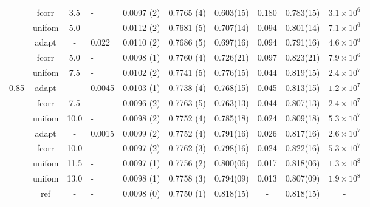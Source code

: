 \documentclass[aps,pre,preprint]{revtex4}
\begin{document}
\begin{table}
\begin{tabular*}{0.99\textwidth}{c|c|@{\extracolsep{\fill}}clcccccc}
    & \textrm{fcorr}  & 3.5     & -       & 0.0097 (2) & 0.7765 (4) & 0.603(15) & 0.180 & 0.783(15) & $3.1\times 10^6$\\\cline{2-10}
    & \textrm{unifom} & 5.0     & -       & 0.0112 (2) & 0.7681 (5) & 0.707(14) & 0.094 & 0.801(14) & $7.1\times 10^6$\\
    & \textrm{adapt}  & -       & 0.022   & 0.0110 (2) & 0.7686 (5) & 0.697(16) & 0.094 & 0.791(16) & $4.6\times 10^6$\\
    & \textrm{fcorr}  & 5.0     & -       & 0.0098 (1) & 0.7760 (4) & 0.726(21) & 0.097 & 0.823(21) & $7.9\times 10^6$\\\cline{2-10}
    & \textrm{unifom} & 7.5     & -       & 0.0102 (2) & 0.7741 (5) & 0.776(15) & 0.044 & 0.819(15) & $2.4\times 10^7$\\
0.85& \textrm{adapt}  & -       & 0.0045  & 0.0103 (1) & 0.7738 (4) & 0.768(15) & 0.045 & 0.813(15) & $1.2\times 10^7$\\
    & \textrm{fcorr}  & 7.5     & -       & 0.0096 (2) & 0.7763 (5) & 0.763(13) & 0.044 & 0.807(13) & $2.4\times 10^7$\\\cline{2-10}
    & \textrm{unifom} & 10.0    & -       & 0.0098 (2) & 0.7752 (4) & 0.785(18) & 0.024 & 0.809(18) & $5.3\times 10^7$\\
    & \textrm{adapt}  & -       & 0.0015  & 0.0099 (2) & 0.7752 (4) & 0.791(16) & 0.026 & 0.817(16) & $2.6\times 10^7$\\
    & \textrm{fcorr}  & 10.0    & -       & 0.0097 (2) & 0.7762 (3) & 0.798(16) & 0.024 & 0.822(16) & $5.3\times 10^7$\\
    & \textrm{unifom} & 11.5    & -       & 0.0097 (1) & 0.7756 (2) & 0.800(06) & 0.017 & 0.818(06) & $1.3\times 10^8$\\
    & \textrm{unifom} & 13.0    & -       & 0.0098 (1) & 0.7758 (3) & 0.794(09) & 0.013 & 0.807(09) & $1.9\times 10^8$\\\cline{2-10}
    & \textrm{ref}    & -       & -       & 0.0098 (0) & 0.7750 (1) & 0.818(15) & -     & 0.818(15) & - \\    \hline\hline
  \end{tabular*}
\end{table}
\end{document}
